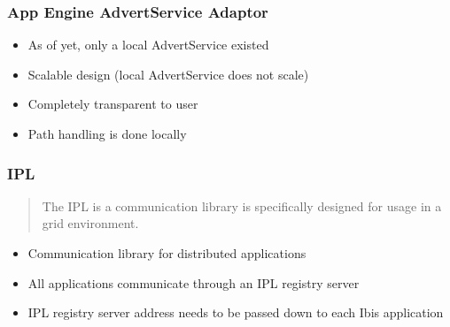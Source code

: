 \documentclass{beamer}
\begin{document}


\frame
{
	\frametitle{App Engine AdvertService Adaptor}
	\begin{itemize}
		\item As of yet, only a local AdvertService existed
		\item Scalable design (local AdvertService does not scale)
		\item Completely transparent to user
		\item Path handling is done locally
    \end{itemize}
}

\frame
{
	\frametitle{IPL}
	\begin{quote}
		The IPL is a communication library is specifically designed for usage in a
		grid environment.
	\end{quote}
	\begin{itemize}
    	\item Communication library for distributed applications
    	\item All applications communicate through an IPL registry server
    	\item IPL registry server address needs to be passed down to each Ibis
    		application
    \end{itemize}
}
\end{document}
